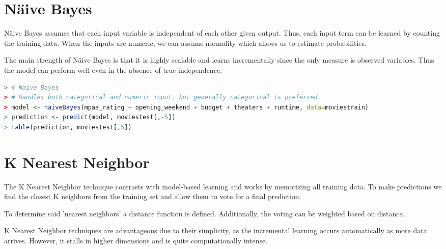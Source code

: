 \documentclass{article}
\begin{document}
\begin{spacing}{1.1}
\section{N{\"a}ive Bayes}

N{\"a}ive Bayes assumes that each input variable is independent of each other given output.  Thus, each input term can be learned by counting the training data.  When the inputs are numeric, we can assume normality which allows us to estimate probabilities.  

\vspace{3mm}

The main strength of N{\"a}ive Bayes is that it is highly scalable and learns incrementally since the only measure is observed variables.  Thus the model can perform well even in the absence of true independence.  

\begin{lstlisting}[language = R]
> # Naive Bayes
> # Handles both categorical and numeric input, but generally categorical is preferred
> model <- naiveBayes(mpaa_rating ~ opening_weekend + budget + theaters + runtime, data=moviestrain)
> prediction <- predict(model, moviestest[,-5])
> table(prediction, moviestest[,5])
\end{lstlisting}


\section{K Nearest Neighbor}

The K Nearest Neighbor technique contrasts with model-based learning and works by memorizing all training data.  To make predictions we find the closest K neighbors from the training set and allow them to vote for a final prediction.  

\vspace{3mm}

To determine said 'nearest neighbors' a distance function is defined.  Additionally, the voting can be weighted based on distance.  

\vspace{3mm}

K Nearest Neighbor techniques are advantageous due to their simplicity, as the incremental learning occurs automatically as more data arrives.  However, it stalls in higher dimensions and is quite computationally intense.  

\vspace{3mm}

\begin{lstlisting}[language=R]


\end{lstlisting}
\end{spacing}
\end{document}
